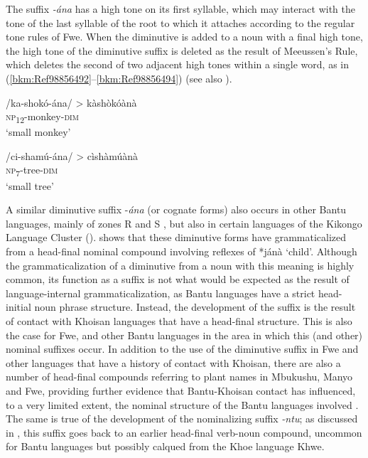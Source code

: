 The suffix \textit{-ána} has a high tone on its first syllable, which may interact with the tone of the last syllable of the root to which it attaches according to the regular tone rules of Fwe. When the diminutive is added to a noun with a final high tone, the high tone of the diminutive suffix is deleted as the result of Meeussen’s Rule, which deletes the second of two adjacent high tones within a single word, as in (\ref{bkm:Ref98856492}--\ref{bkm:Ref98856494}) (see also ).

\ea
\label{bkm:Ref98856492}
/ka-shokó-ána/ > kàshòkóànà\\
\textsc{np}\textsubscript{12}-monkey-\textsc{dim}\\
\glt ‘small monkey’
\z

\ea
\label{bkm:Ref98856494}
/ci-shamú-ána/ > cìshàmúànà\\
\textsc{np}\textsubscript{7}-tree-\textsc{dim}\\
\glt ‘small tree’
\z

A similar diminutive suffix -\textit{ána} (or cognate forms) also occurs in other Bantu languages, mainly of zones R and S \citep{GibsonEtAl2017}, but also in certain languages of the Kikongo Language Cluster (\citealt{GoesBostoen2021}). {\citet{Güldemann1999}} shows that these diminutive forms have grammaticalized from a head-final nominal compound involving reflexes of *jánà ‘child’. Although the grammaticalization of a diminutive from a noun with this meaning is highly common, its function as a suffix is not what would be expected as the result of language-internal grammaticalization, as Bantu languages have a strict head-initial noun phrase structure. Instead, the development of the suffix is the result of contact with Khoisan languages that have a head-final structure. This is also the case for Fwe, and other Bantu languages in the area in which this (and other) nominal suffixes occur. In addition to the use of the diminutive suffix in Fwe and other languages that have a history of contact with Khoisan, there are also a number of head-final compounds referring to plant names in Mbukushu, Manyo and Fwe, providing further evidence that Bantu-Khoisan contact has influenced, to a very limited extent, the nominal structure of the Bantu languages involved \citep{GunninkEtAl2015}. The same is true of the development of the nominalizing suffix \textit{-ntu}; as discussed in , this suffix goes back to an earlier head-final verb-noun compound, uncommon for Bantu languages but possibly calqued from the Khoe language Khwe.

